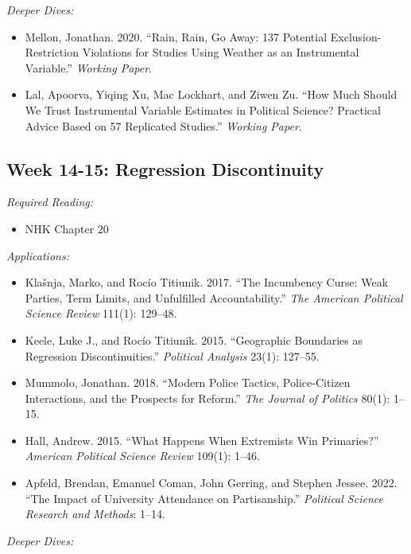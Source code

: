 \documentclass[11pt, letterpaper]{article}
\begin{document}
\noindent \textit{Deeper Dives:}

\begin{itemize}
	\item Mellon, Jonathan. 2020. ``Rain, Rain, Go Away: 137 Potential Exclusion-Restriction Violations for Studies Using Weather as an Instrumental Variable.'' \textit{Working Paper}.
	\item Lal, Apoorva, Yiqing Xu, Mac Lockhart, and Ziwen Zu. ``How Much Should We Trust Instrumental Variable Estimates in Political Science? Practical Advice Based on 57 Replicated Studies.'' \textit{Working Paper}.
\end{itemize}


\subsection*{Week 14-15: Regression Discontinuity}

\textit{Required Reading:}

\begin{itemize}
	\item NHK Chapter 20
\end{itemize}


\noindent \textit{Applications:}

\begin{itemize}
	\item Klašnja, Marko, and Rocío Titiunik. 2017. ``The Incumbency Curse: Weak Parties, Term Limits, and Unfulfilled Accountability.'' \textit{The American Political Science Review} 111(1): 129–48.
	\item Keele, Luke J., and Rocío Titiunik. 2015. ``Geographic Boundaries as Regression Discontinuities.'' \textit{Political Analysis} 23(1): 127–55.
	\item Mummolo, Jonathan. 2018. ``Modern Police Tactics, Police-Citizen Interactions, and the Prospects for Reform.'' \textit{The Journal of Politics} 80(1): 1–15.
	\item Hall, Andrew. 2015. ``What Happens When Extremists Win Primaries?'' \textit{American Political Science Review} 109(1): 1–46.
	\item Apfeld, Brendan, Emanuel Coman, John Gerring, and Stephen Jessee. 2022. ``The Impact of University Attendance on Partisanship.'' \textit{Political Science Research and Methods}: 1–14.
\end{itemize}

\noindent \textit{Deeper Dives:}
\end{document}
